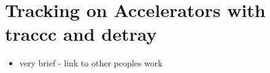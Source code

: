 \section{Tracking on Accelerators with traccc and detray}

\begin{itemize}
    \color{red}
    \item very brief - link to other peoples work
\end{itemize}
